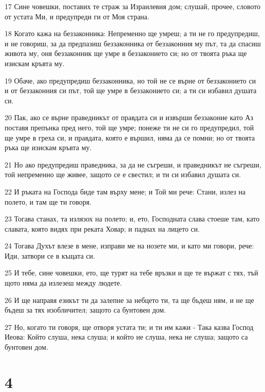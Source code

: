 \par 17 Сине човешки, поставих те страж за Израилевия дом; слушай, прочее, словото от устата Ми, и предупреди ги от Моя страна.
\par 18 Когато кажа на беззаконника: Непременно ще умреш; а ти не го предупредиш, и не говориш, за да предпазиш беззаконника от беззаконния му път, та да спасиш живота му, оня беззаконник ще умре в беззаконието си; но от твоята ръка ще изискам кръвта му.
\par 19 Обаче, ако предупредиш беззаконника, но той не се върне от беззаконието си и от беззаконния си път, той ще умре в беззаконието си; а ти си избавил душата си.
\par 20 Пак, ако се върне праведникът от правдата си и извърши беззаконие като Аз поставя препънка пред него, той ще умре; понеже ти не си го предупредил, той ще умре в греха си, и правдата, която е вършил, няма да се помни; но от твоята ръка ще изискам кръвта му.
\par 21 Но ако предупредиш праведника, за да не съгреши, и праведникът не съгреши, той непременно ще живее, защото се е свестил; и ти си избавил душата си.
\par 22 И ръката на Господа биде там върху мене; и Той ми рече: Стани, излез на полето, и там ще ти говоря.
\par 23 Тогава станах, та излязох на полето; и, ето, Господната слава стоеше там, като славата, която видях при реката Ховар; и паднах на лицето си.
\par 24 Тогава Духът влезе в мене, изправи ме на нозете ми, и като ми говори, рече: Иди, затвори се в къщата си.
\par 25 И тебе, сине човешки, ето, ще турят на тебе връзки и ще те вържат с тях, тъй щото няма да излезеш между людете.
\par 26 И ще направя езикът ти да залепне за небцето ти, та ще бъдеш ням, и не ще бъдеш за тях изобличител; защото са бунтовен дом.
\par 27 Но, когато ти говоря, ще отворя устата ти; и ти им кажи - Така казва Господ Иеова: Който слуша, нека слуша; и който не слуша, нека не слуша; защото са бунтовен дом.

\chapter{4}

